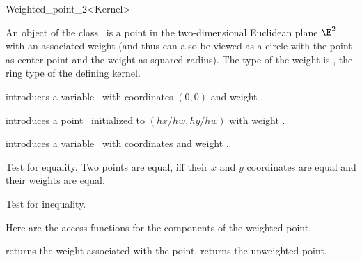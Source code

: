 \begin{ccRefClass} {Weighted_point_2<Kernel>}

\ccDefinition
An object of the class \ccRefName\ is a point in the two-dimensional
Euclidean plane $\E^2$ with an associated weight (and thus can also
be viewed as a circle with the point as center point and the weight
as squared radius).  The type of the weight is ,
the ring type of the defining kernel.

\ccInheritsFrom
{}

\ccTypes


\ccCreation
{}

            {introduces a variable \ccVar\ with  
             coordinates $(0,0)$ and weight .}

            {introduces a point \ccVar\ initialized to $(hx/hw,hy/hw)$ with 
             weight .
	      }

            {introduces a variable \ccVar\ with  
             coordinates  and weight .}


\ccOperations

       {Test for equality. Two points are equal, iff their $x$ and $y$ 
        coordinates are equal and their weights are equal.}

       {Test for inequality.}

Here are the access functions for the components of the weighted point.

       {returns the weight associated with the point.}
\ccGlue
{}
       {returns the unweighted point.}

\ccExample


\end{ccRefClass}
